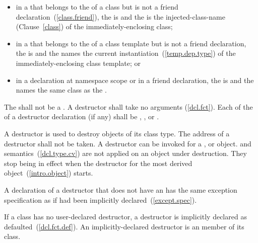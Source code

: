 \begin{itemize}
\item
in a  that belongs to the
 of a class but is not a friend
declaration~(\ref{class.friend}), the  is
\tcode{\~} and the  is the
injected-class-name (Clause~\ref{class}) of the immediately-enclosing class;

\item
in a  that belongs to the
 of a class template but is not a friend
declaration, the  is
\tcode{\~} and the  names the
current instantiation~(\ref{temp.dep.type}) of the immediately-enclosing class template; or

\item
in a declaration at namespace scope or in a friend declaration, the
 is 
\tcode{\~} and the  names the
same class as the .
\end{itemize}

The  shall not be a . A
destructor shall take no arguments (\ref{dcl.fct}).
Each  of the 
of a destructor declaration (if any) shall be , , or
.

\pnum
A destructor is used to destroy objects of its class type.
%
The address of a destructor shall not be taken.
%
%
A destructor can be invoked for a
,
or
object.
and
semantics~(\ref{dcl.type.cv}) are not applied on an object under destruction.
They stop being in effect when the destructor for the
most derived object~(\ref{intro.object}) starts.

\pnum
A declaration of a destructor that does not have an 
has the same exception specification as if had been implicitly declared~(\ref{except.spec}).

\pnum
{}%
%
%
If a class has no user-declared
destructor, a destructor is implicitly
declared as defaulted~(\ref{dcl.fct.def}).
An implicitly-declared destructor is an
member of its class.

